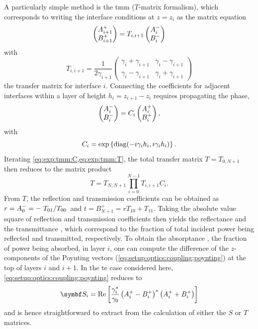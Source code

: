 A particularly simple method is the \acrlong{tmm} ($T$-matrix formalism), which corresponds to writing the interface conditions at $z=z_i$ as the matrix equation
\begin{equation}\label{eq:exp:tmm:interface}
    \pmqty{A_{i+1}^{+}\\B_{i+1}^{+}} = T_{i,i+1}\pmqty{A_{i}^{-}\\B_{i}^{-}}
\end{equation}
with
\begin{equation}\label{eq:exp:tmm:T}
    T_{i,i+1} = \frac{1}{2\gamma_{i+1}}\begin{pmatrix}
                                           \gamma_{i} + \gamma_{i+1} & \gamma_{i} - \gamma_{i+1} \\
                                           \gamma_{i} - \gamma_{i+1} & \gamma_{i} + \gamma_{i+1}
    \end{pmatrix}
\end{equation}
the transfer matrix for interface $i$.
Connecting the coefficients for adjacent interfaces within a layer of height $h_i = z_{i+1} - z_{i}$ requires propagating the phase,
\begin{equation}\label{eq:exp:tmm:propagation}
    \pmqty{A_{i}^{-}\\B_{i}^{-}} = C_{i}\pmqty{A_{i}^{+}\\B_{i}^{+}},
\end{equation}
with
\begin{equation}\label{eq:exp:tmm:C}
    C_{i} = \exp\left\lbrace\operatorname{diag}(-i\gamma_i h_i, i\gamma_i h_i)\right\rbrace.
\end{equation}
Iterating \cref{eq:exp:tmm:C,eq:exp:tmm:T}, the total transfer matrix $T = T_{0,N+1}$ then reduces to the matrix product
\begin{equation}\label{eq:exp:tmm:T:total}
    T = T_{N,N+1}\prod_{i=0}^{N-1} T_{i,i+1} C_i.
\end{equation}
From $T$, the reflection and transmission coefficients can be obtained as $r=A_0^{-}=-\flatfrac{T_{01}}{T_{00}}$ and $t=B_{N+1}^{+}=rT_{10} + T_{11}$.
Taking the absolute value square of reflection and transmission coefficients then yields the reflectance  and the transmittance \transmittance, which correspond to the fraction of total incident power being reflected and transmitted, respectively.
To obtain the absorptance \absorptance, the fraction of power being absorbed, in layer $i$, one can compute the difference of the $z$-components of the Poynting vectors (\cf \cref{eq:setup:optics:coupling:poynting}) at the top of layers $i$ and $i+1$.
In the \gls{te} case considered here, \cref{eq:setup:optics:coupling:poynting} reduces to~\cite{Langevin2024}
\begin{equation}\label{eq:exp:tmm:poynting}
    \bvec{S}_i = \re\left[\frac{\gamma_i^{\ast}}{\gamma_0}\left(A_i^{+} - B_i^{+}\right)^{\ast}\left(A_i^{+} + B_i^{+}\right)\right]
\end{equation}
and is hence straightforward to extract from the calculation of either the $S$ or $T$ matrices.

